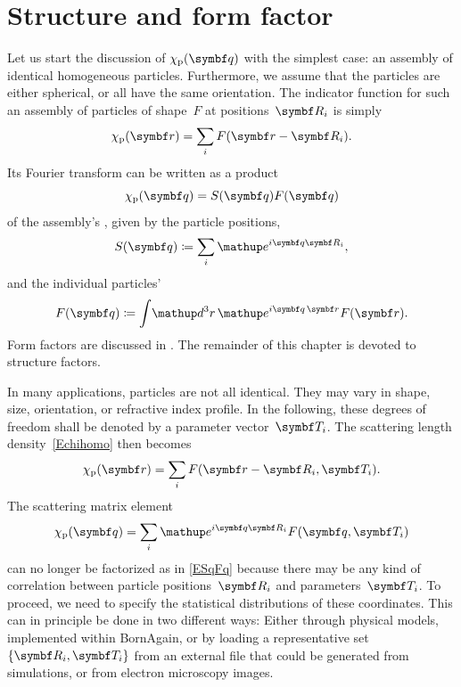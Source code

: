 \section{Structure and form factor}\label{SPartFactors}

Let us start the discussion of $\chi_\sp(\q)$ with the simplest case:
an assembly of identical homogeneous particles.
Furthermore, we assume that the particles are either spherical,
or all have the same orientation.
The indicator function for such an assembly of
particles of shape~$F$ at positions~$\R_i$ is simply
\begin{equation}\label{Echihomo}
  \chi_\sp(\r) = \sum_i F(\r-\R_i).
\end{equation}
Its Fourier transform can be written as a product
\begin{equation}\label{ESqFq}
  \chi_\sp(\q) = S(\q) F(\q)
\end{equation}
of the assembly's , given by the particle positions,
\begin{equation}\label{EdefSq}
  S(\q) \coloneqq \sum_i \e^{i\q\R_i},
\end{equation}
and the individual particles' 
\begin{equation}\label{EdefFq}
  F(\q) \coloneqq \int\!\d^3r\, \e^{i\v{q}\,\r} F(\r).
\end{equation}
Form factors are discussed in .
The remainder of this chapter is devoted to structure factors.

In many applications,
particles are not all identical.
They may vary in shape, size, orientation, or refractive index profile.
In the following, these degrees of freedom
shall be denoted by a parameter vector~$\v{T}_i$.
The scattering length density~\cref{Echihomo} then becomes
\begin{equation}\label{Echihetero}
  \chi_\text{p}(\r) = \sum_i F(\r-\R_i,\v{T}_i).
\end{equation}
The scattering matrix element
\begin{equation}\label{Echiqsum}
  \chi_\text{p}(\q) = \sum_i \e^{i\q\R_i} F(\q,\v{T}_i)
\end{equation}
can no longer be factorized as in \cref{ESqFq}
because there may be any kind of correlation
between particle positions~$\R_i$ and parameters~$\v{T}_i$.
To proceed,
we need to specify the statistical distributions
of these coordinates.
This can in principle be done in two different ways:
Either through physical models, implemented within BornAgain,
or by loading a representative set $\{\R_i,\v{T}_i\}$
from an external  file
that could be generated from simulations,
or from electron microscopy images.

